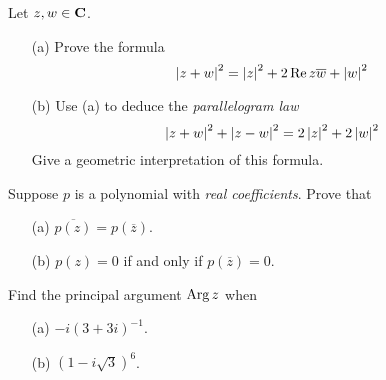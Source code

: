 \vspace{0.1in}

\begin{problem}\label{prob 2.4a}
Let $z,w \in \mathbf C$. 
\begin{itemize}[itemsep=1em]
\item[(a)] Prove the formula
\[\left\lvert z+w\right\rvert^2 = \left\lvert z\right\rvert^2 + 2 \operatorname{Re} z\overline{w} + \left\lvert w\right\rvert^2\]
\item[(b)] Use (a) to deduce the \emph{parallelogram law}
\[\left\lvert z+w\right\rvert^2 + \left\lvert z-w\right\rvert^2 = 2\left\lvert z\right\rvert^2 + 2\left\lvert w\right\rvert^2\]
Give a geometric interpretation of this formula. 
\end{itemize}
\end{problem}

\vspace{0.1in}

\begin{problem}\label{prob 2.5}
Suppose $p$ is a polynomial with \emph{real coefficients}. Prove that
\begin{multicols}{2}
\begin{itemize}
\item[(a)] $\overline{p(z)} = p(\overline{z})$.
\item[(b)] $p(z) = 0$ if and only if $p(\overline{z}) = 0$.
\end{itemize}
\end{multicols}
\end{problem}

\vspace*{0.1in}

\begin{problem}\label{prob 2.7}
Find the principal argument $\operatorname{Arg} z$ when
\begin{multicols}{2}
\begin{itemize}
\item[(a)] $-i(3 + 3i)^{-1}$.
\item[(b)] $(1 - i\sqrt{3})^6$.
\end{itemize}
\end{multicols}
\end{problem}